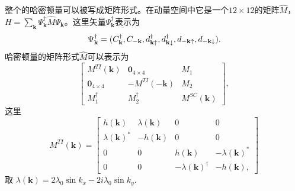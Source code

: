  整个的哈密顿量可以被写成矩阵形式。在动量空间中它是一个$12\times 12$的矩阵$\hat{M}$，$H=\sum_{\mathbf{k}}\Psi_\mathbf{k}^\dagger\hat{M}\Psi_\mathbf{k}$。这里矢量$\Psi^\dagger_\mathbf{k}$表示为
\begin{equation}
\Psi^\dagger_{\bf k}=(C^\dagger_{\bf k},C_{-{\bf k}},d^\dagger_{{\bf k}\uparrow},d^\dagger_{{\bf k}\downarrow},d_{-{\bf k}\uparrow},d_{-{\bf k}\downarrow}).
\end{equation}
哈密顿量的矩阵形式$\hat{M}$可以表示为
\begin{equation}
\left[
\begin{array}{ccc}
M^{TI}(\mathbf{k}) & \mathbf{0}_{4\times 4} &M_1 \\
\mathbf{0}_{4\times 4} & -M^{TI}(\mathbf{-k}) & M_2 \\
M^{\dagger}_1 & M^{\dagger}_2 & M^{SC}(\mathbf{k})
\end{array}
\right],
\end{equation}
这里
\begin{equation}
M^{TI}(\mathbf{k})=\left[
\begin{array}{cccc}
h({\mathbf{k}}) & \lambda(\mathbf{k}) & 0 & 0 \\
\lambda(\mathbf{k})^* & -h({\mathbf{k}}) & 0 & 0 \\
0 & 0 & h({\mathbf{k}}) & -\lambda(\mathbf{k})^* \\
0 & 0 & -\lambda(\mathbf{k})^\dagger & -h({\mathbf{k}}),
\end{array}
\right]
\end{equation}
取 $\lambda(\mathbf{k})= 2\lambda_0\sin k_x- 2i\lambda_0\sin k_y$.

